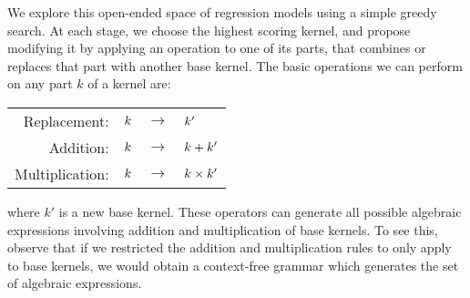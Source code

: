 We explore this open-ended space of regression models using a simple greedy search.
At each stage, we choose the highest scoring kernel, and propose modifying it by applying an operation to one of its parts, that combines or replaces that part with another base kernel.
The basic operations we can perform on any part $k$ of a kernel are:
%
\begin{center}
\begin{tabular}{rccl}
\textnormal{Replacement:}    & $k$ & $\to$ & $k'$\\
\textnormal{Addition:}       & $k$ & $\to$ & $k + k'$\\
\textnormal{Multiplication:} & $k$ &  $\to$ & $k \times k'$\\
\end{tabular}
\end{center}
%
where $k'$ is a new base kernel.
These operators can generate all possible algebraic expressions involving addition and multiplication of base kernels.
To see this, observe that if we restricted the addition and multiplication rules to only apply to base kernels, we would obtain a context-free grammar which generates the set of algebraic expressions.


